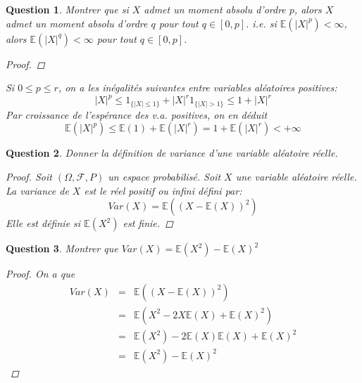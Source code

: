 \documentclass{article}
\theoremstyle{plain}
\newtheorem{question}{Question}
\begin{document}
\begin{question}
	Montrer que si $X$ admet un moment absolu d'ordre $p$, alors $X$ admet un moment absolu d'ordre $q$ pour tout $q \in [0, p]$.
	i.e. si $\mathbb{E} (|X|^p) < \infty$, alors $\mathbb{E} (|X|^q) < \infty$ pour tout $q \in [0, p]$.
	\begin{proof}
	\end{proof}
	Si $0 \leq p \leq r$, on a les inégalités suivantes entre variables aléatoires positives:
	$$|X|^p \leq \mathscr{1}_{\{|X|\leq 1\}} + |X|^r\mathscr{1}_{\{|X|>1\}} \leq 1 + |X|^r$$
	Par croissance de l’espérance des v.a. positives, on en déduit
	$$\mathbb{E}(|X|^p) \leq \mathbb{E}(1) + \mathbb{E}(|X|^r) = 1 + \mathbb{E}(|X|^r) < +\infty$$

\end{question}

\begin{question}
	Donner la définition de variance d'une variable aléatoire réelle.
	\begin{proof}
		Soit $(\Omega, \mathscr{F}, P)$ un espace probabilisé. Soit $X$ une variable aléatoire réelle. La variance de $X$ est le réel positif ou infini défini par:
		\begin{equation*}
			Var(X) = \mathbb{E} ((X - \mathbb{E} (X))^2)
		\end{equation*}
		Elle est définie si $\mathbb{E} (X^2)$ est finie.
	\end{proof}
\end{question}

\begin{question}
	Montrer que $Var(X) = \mathbb{E} (X^2) - \mathbb{E} (X)^2$
	\begin{proof}
		On a que
		\begin{eqnarray*}
			Var(X) &=& \mathbb{E} ((X - \mathbb{E} (X))^2) \\
			&=& \mathbb{E} (X^2 - 2X\mathbb{E} (X) + \mathbb{E} (X)^2) \\
			&=& \mathbb{E} (X^2) - 2\mathbb{E} (X)\mathbb{E} (X) + \mathbb{E} (X)^2 \\
			&=& \mathbb{E} (X^2) - \mathbb{E} (X)^2
		\end{eqnarray*}
	\end{proof}
\end{question}
\end{document}
